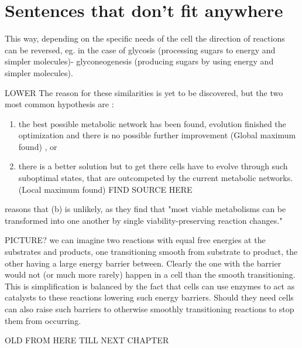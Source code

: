 \documentclass[10pt,a4paper]{article}
\begin{document}
\section{Sentences that don't fit anywhere}
\label{sec:sentences_that_don_t_fit_anywhere}

This way, depending on the specific needs of the cell the direction of reactions can be reversed, eg. in the case of glycosis (processing sugars to energy and simpler molecules)- glyconeogenesis (producing sugars by using energy and simpler molecules).


	LOWER The reason for these similarities is yet to be discovered, but the two most common hypothesis  are : 
	\begin{enumerate}[label=(\alph*)]
	\item the best possible metabolic network has been found, evolution finished the optimization and there is no possible further improvement (Global maximum found) \cite{theoretical} \cite{latent} \cite{strategy}, or 
	\item there is a better solution but to get there cells have to evolve through such suboptimal states, that are outcompeted by the current metabolic networks. (Local maximum found) FIND SOURCE HERE
	\end{enumerate} 
	 \cite{historical} reasons that (b) is unlikely, as they find that  "most viable metabolisms can be transformed into one another by single viability-preserving reaction changes."  
	
	PICTURE? we can imagine two reactions with equal free energies at the substrates and products, one transitioning smooth from substrate to product, the other having a large energy barrier between. Clearly the one with the barrier would not (or much more rarely) happen in a cell than the smooth transitioning. This is simplification is balanced by the fact that cells can use enzymes to act as catalysts to these reactions lowering such energy barriers. Should they need cells can also raise such barriers to otherwise smoothly transitioning reactions to stop them from occurring. 



	OLD FROM HERE TILL NEXT CHAPTER
\end{document}
